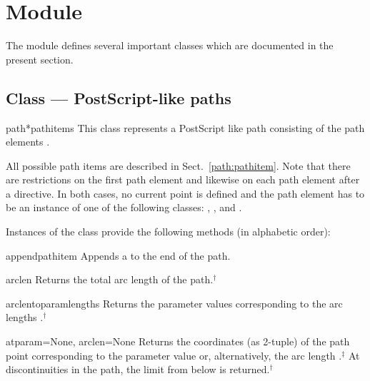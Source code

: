 \section{Module }


\label{path}

The  module defines several important classes which are
documented in the present section.

\subsection{Class  --- PostScript-like paths}

\label{path:path}


\begin{classdesc}{path}{*pathitems}
This class represents a PostScript like path consisting of the
path elements .

All possible path items are described in Sect.~\ref{path:pathitem}.
Note that there are restrictions on the first path element and likewise
on each path element after a  directive. In both cases,
no current point is defined and the path element has to be an instance
of one of the following classes: , , and
.
\end{classdesc}

Instances of the class  provide the following
methods (in alphabetic order):

\begin{methoddesc}{append}{pathitem}
Appends a  to the end of the path.
\end{methoddesc}

\begin{methoddesc}{arclen}{}
Returns the total arc length of the path.$^\dagger$
\end{methoddesc}

\begin{methoddesc}{arclentoparam}{lengths}
  Returns the parameter values corresponding to the arc lengths
  .$^\dagger$
\end{methoddesc}

\begin{methoddesc}{at}{param=None, arclen=None}
  Returns the coordinates (as 2-tuple) of the path point corresponding
  to the parameter value  or, alternatively, the arc length
  .$^\ddagger$ At discontinuities in the path, the limit
  from below is returned.$^\dagger$
\end{methoddesc}


